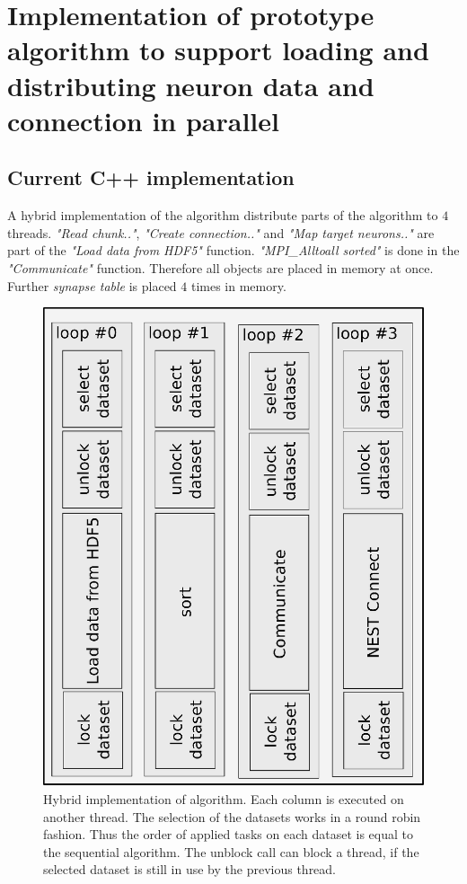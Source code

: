 \documentclass[a4paper]{article}
\begin{document}
\section{Implementation of prototype algorithm to support loading and distributing neuron data and connection in parallel}
\subsection{Current C++ implementation}
\label{sec:currentImpl}
A hybrid implementation of the algorithm distribute parts of the algorithm to $4$ threads.
\emph{"Read chunk.."}, \emph{"Create connection.."} and \emph{"Map target neurons.."} are part of the \emph{"Load data from HDF5"} function.
\emph{"MPI\_Alltoall sorted"} is done in the \emph{"Communicate"} function.
Therefore all objects are placed in memory at once.
Further \emph{synapse table} is placed $4$ times in memory.

\begin{figure}[h]
\centering
\includegraphics[scale=0.5]{alg_hybrid.eps}
	\caption{Hybrid implementation of algorithm. Each column is executed on another thread. 
	The selection of the datasets works in a round robin fashion.
	Thus the order of applied tasks on each dataset is equal to the sequential algorithm.
	The unblock call can block a thread, if the selected dataset is still in use by the previous thread.}
	\label{Mikesformatcon}
\end{figure}
\end{document}
